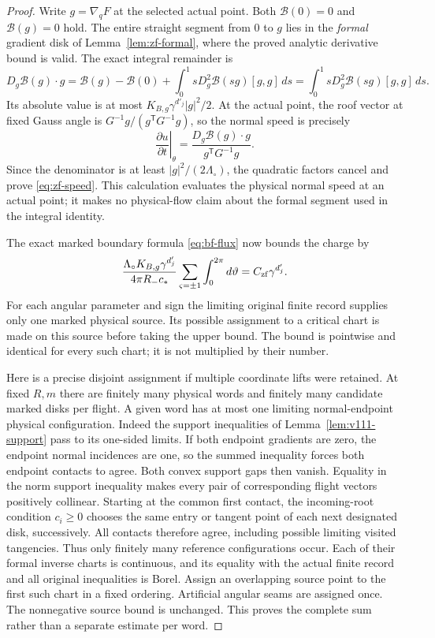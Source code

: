 \begin{proof}
Write $g=\nabla_qF$ at the selected actual point.  Both
$\mathcal B(0)=0$ and $\mathcal B(g)=0$ hold.  The entire straight
segment from $0$ to $g$ lies in the \emph{formal} gradient disk of
Lemma~\ref{lem:zf-formal}, where the proved analytic derivative
bound is valid.  The exact integral remainder is
\begin{equation}\label{eq:zf-euler}
 D_g\mathcal B(g)\cdot g
 =\mathcal B(g)-\mathcal B(0)
       +\int_0^1 sD_g^2\mathcal B(sg)[g,g]\,ds
 =\int_0^1 sD_g^2\mathcal B(sg)[g,g]\,ds.
\end{equation}
Its absolute value is at most
$K_{B,g}\gamma^{d'_j}|g|^2/2$.
At the actual point, the roof vector at fixed Gauss angle is
$G^{-1}g/(g^{\mathsf T}G^{-1}g)$, so the normal speed is precisely
\[
 \left.\frac{\partial u}{\partial t}\right|_\theta
  =\frac{D_g\mathcal B(g)\cdot g}
            {g^{\mathsf T}G^{-1}g}.
\]
Since the denominator is at least $|g|^2/(2\Lambda_\circ)$,
the quadratic factors cancel and prove \eqref{eq:zf-speed}.
This calculation evaluates the physical normal speed at an actual
point; it makes no physical-flow claim about the formal segment
used in the integral identity.

The exact marked boundary formula \eqref{eq:bf-flux} now bounds
the charge by
\[
 \frac{\Lambda_\circ K_{B,g}\gamma^{d'_j}}
      {4\pi R_-c_*}
        \sum_{\varsigma=\pm1}\int_0^{2\pi}d\vartheta
 = C_{\rm zf}\gamma^{d'_j}.
\]
For each angular parameter and sign the limiting original finite
record supplies only one marked physical source.  Its possible
assignment to a critical chart is made on this source before taking
the upper bound.  The bound is pointwise and identical for every
such chart; it is not multiplied by their number.

Here is a precise disjoint assignment if multiple coordinate lifts
were retained.  At fixed $R,m$ there are finitely many physical words
and finitely many candidate marked disks per flight.  A given word
has at most one limiting normal-endpoint physical configuration.
Indeed the support inequalities of Lemma~\ref{lem:v111-support}
pass to its one-sided limits.  If both endpoint gradients are zero,
the endpoint normal incidences are one, so the summed inequality
forces both endpoint contacts to agree.  Both convex support gaps
then vanish.  Equality in the norm support inequality makes every
pair of corresponding flight vectors positively collinear.  Starting
at the common first contact, the incoming-root condition
$c_i\ge0$ chooses the same entry or tangent point of each next
designated disk, successively.  All contacts therefore agree,
including possible limiting visited tangencies.  Thus only finitely
many reference configurations occur.  Each of their formal inverse
charts is continuous, and its equality with the actual finite record
and all original inequalities is Borel.  Assign an overlapping
source point to the first such chart in a fixed ordering.  Artificial
angular seams are assigned once.  The nonnegative source bound is
unchanged.  This proves the complete sum rather than a separate
estimate per word.


\end{proof}
